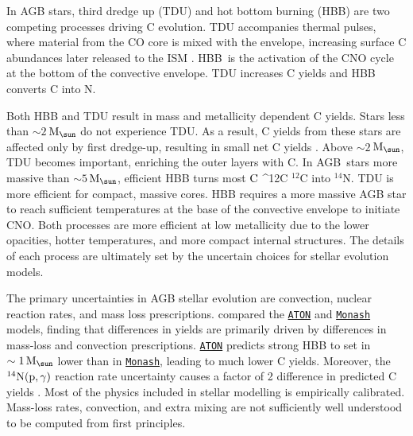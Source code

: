 \documentclass[fleqn,
referee, %
usenatbib]{mnras}
\makeatletter
\newcommand{\monash}{\texttt{\hyperlink{monash}{Monash}}}
\newcommand{\aton}{\texttt{\hyperlink{aton}{ATON}}}
\newcommand{\agb}{AGB}
\newcommand{\C}[1][\@nil]{
    \def\tmp{#1}%
    \ifx\tmp\@nnil%
        \ensuremath{\rm C}%
    \else%
        \ifmmode ^{#1}{\rm C}%
        \else $^{#1}$C%
        \fi%
\fi }
\newcommand{\Mo}{ {\rm M}_{\sun}}
\newcommand{\about}[1]{${\sim} #1$}
\makeatother
\begin{document}
In AGB stars, {third dredge up} (TDU) and {hot bottom burning} (HBB) are two competing processes driving C evolution.
TDU accompanies thermal pulses, where material from the CO core is mixed with the envelope, increasing surface C abundances 
later released to the ISM \citep{KL14}.  
HBB\ is the activation of the CNO cycle at the bottom of the convective envelope.
TDU increases C yields and HBB converts C into N. 



Both HBB and TDU result in mass and metallicity dependent C yields. 
Stars less than \about{2}\,$\Mo$ do not experience TDU. As a result, C yields from these stars are affected only by first dredge-up, resulting in small net C yields \citep[Table 1]{karakas10}.
Above \about{2}\,$\Mo$, TDU becomes important, enriching the outer layers with C.
In \agb\ stars more massive than \about{5}\,$\Mo$, efficient HBB turns most \C[12] into $^{14}$N.
TDU is more efficient for compact, massive cores. HBB requires a more massive AGB star to reach sufficient temperatures at the base of the convective envelope to initiate CNO. Both processes are more efficient at low metallicity due to the lower opacities, hotter temperatures, and more compact internal structures. The details of each process are ultimately set by the uncertain choices for stellar evolution models.



The primary uncertainties in AGB stellar evolution are convection, nuclear reaction rates, and mass loss prescriptions.
\citet{ventura+15} compared the \aton{} and \monash{} models, finding that differences in yields are primarily driven by differences in mass-loss and convection prescriptions. \aton{} predicts strong HBB to set in $\sim{1}\,\Mo$ lower than in \monash{}, leading to much lower C yields.
Moreover, the $^{14}{\rm N}({\rm p},\gamma)$ reaction rate uncertainty causes a factor of 2 difference in predicted C yields \citep{herwig+austin2004, HAL2006}.
Most of the physics included in stellar modelling is empirically calibrated. Mass-loss rates, convection, and extra mixing are not sufficiently well understood to be computed from first principles.
\end{document}
